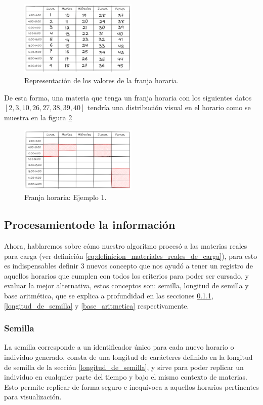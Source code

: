 \begin{figure}[h]
    \centering
    \includegraphics[width=0.5\textwidth]{images/franja-horaria.png}
    \caption{Representación de los valores de la franja horaria.}
    \label{fig:franja-horaria}
\end{figure}

De esta forma, una materia que tenga un franja horaria con los siguientes datos 
$[2, 3, 10, 26, 27, 38, 39, 40]$ tendría una distribución visual en el horario como se muestra en la figura \ref{fig:franja-horaria-caso}

\begin{figure}[h]
    \centering
    \includegraphics[width=0.5\textwidth]{images/franja-horaria-caso.png}
    \caption{Franja horaria: Ejemplo 1.}
    \label{fig:franja-horaria-caso}
\end{figure}

\subsection{Procesamientode la información} \label{procesamiento_de_la_informacion}
Ahora, hablaremos sobre cómo nuestro algoritmo procesó a las materias reales para carga (ver definición \ref{eq:definicion_materiales_reales_de_carga}), para esto es indispensables definir 3 nuevos concepto que nos ayudó a tener un registro de aquellos horarios que cumplen con todos los criterios para poder ser cursado, y evaluar la mejor alternativa, estos conceptos son: semilla, longitud de semilla y base aritmética, que se explica a profundidad en las secciones \ref{semilla}, \ref{longitud_de_semilla} y \ref{base_aritmetica} respectivamente.

\subsubsection{Semilla} \label{semilla}
La semilla corresponde a un identificador único para cada nuevo horario o individuo generado, consta de una longitud de carácteres definido en la longitud de semilla de la sección \ref{longitud_de_semilla}, y sirve para poder replicar un individuo en cualquier parte del tiempo y bajo el mismo contexto de materias. Esto permite replicar de forma seguro e inequívoca a aquellos horarios pertinentes para visualización.

